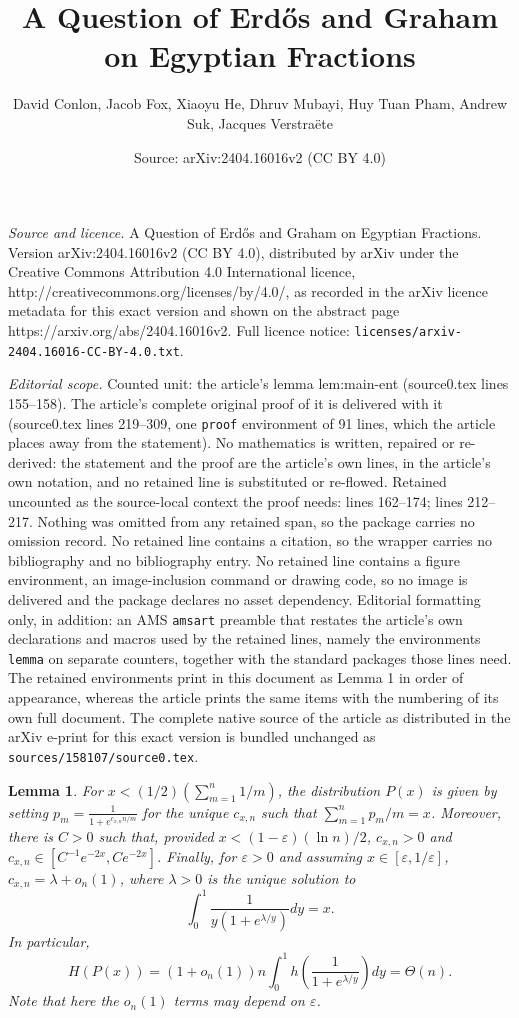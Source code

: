 \documentclass[10pt,a4paper]{amsart}
\title{A Question of Erd\H{o}s and Graham on Egyptian Fractions}
\author{David Conlon, Jacob Fox, Xiaoyu He, Dhruv Mubayi, Huy Tuan Pham, Andrew Suk, Jacques Verstra\"ete}
\date{Source: arXiv:2404.16016v2 (CC BY 4.0)}
\newtheorem{lemma}{Lemma}
\newcommand{\eps}{\varepsilon}
\begin{document}
\maketitle

\noindent\emph{Source and licence.} A Question of Erd\H{o}s and Graham on Egyptian Fractions. Version arXiv:2404.16016v2 (CC BY 4.0), distributed by arXiv under the Creative Commons Attribution 4.0 International licence, http://creativecommons.org/licenses/by/4.0/, as recorded in the arXiv licence metadata for this exact version and shown on the abstract page https://arxiv.org/abs/2404.16016v2. Full licence notice: \texttt{licenses/arxiv-2404.16016-CC-BY-4.0.txt}.\par\smallskip

\noindent\textit{Editorial scope.} Counted unit: the article's lemma lem:main-ent (source0.tex lines 155--158). The article's complete original proof of it is delivered with it (source0.tex lines 219--309, one \texttt{proof} environment of 91 lines, which the article places away from the statement). No mathematics is written, repaired or re-derived: the statement and the proof are the article's own lines, in the article's own notation, and no retained line is substituted or re-flowed.  Retained uncounted as the source-local context the proof needs: lines 162--174; lines 212--217.  Nothing was omitted from any retained span, so the package carries no omission record.  No retained line contains a citation, so the wrapper carries no bibliography and no bibliography entry.  No retained line contains a figure environment, an image-inclusion command or drawing code, so no image is delivered and the package declares no asset dependency.  Editorial formatting only, in addition: an AMS \texttt{amsart} preamble that restates the article's own declarations and macros used by the retained lines, namely the environments \texttt{lemma} on separate counters, together with the standard packages those lines need.  The retained environments print in this document as Lemma 1 in order of appearance, whereas the article prints the same items with the numbering of its own full document.  The complete native source of the article as distributed in the arXiv e-print for this exact version is bundled unchanged as \texttt{sources/158107/source0.tex}.
\begin{lemma}\label{lem:opt-dis}
    For $x < (1/2)(\sum_{m=1}^{n} 1/m)$, the distribution $P(x)$ is given by setting $p_m = \frac{1}{1+e^{c_{x,n} n/m}}$ for the unique $c_{x,n}$ such that $\sum_{m=1}^{n} p_m/m = x$. 
    Moreover, there is $C>0$ such that, provided $x < (1-\eps)(\ln n)/2$, $c_{x,n} > 0$ and $c_{x,n} \in [C^{-1}e^{-2x}, Ce^{-2x}]$. 
    Finally, for $\eps>0$ and assuming $x\in [\eps,1/\eps]$, $c_{x,n} = \lambda+o_n(1)$, where $\lambda > 0$ is the unique solution to 
    \[
        \int_{0}^{1} \frac{1}{y(1+e^{\lambda/y})} dy = x.
    \]
    In particular, 
    \begin{equation}\label{eq:ent-cal}
        H(P(x)) = (1+o_n(1)) n \int_{0}^{1} h\left(\frac{1}{1+e^{\lambda/y}}\right)dy = \Theta(n).
    \end{equation}
    Note that here the $o_n(1)$ terms may depend on $\eps$. 
\end{lemma}
\end{document}
